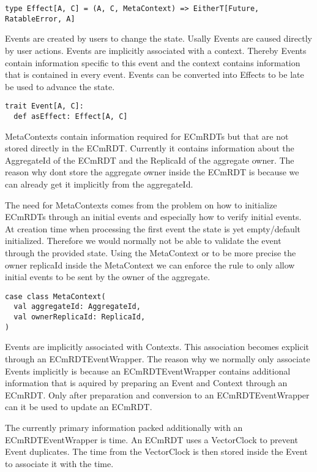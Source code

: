 \documentclass[
	ngerman,
	ruledheaders=section,   %
	class=report,		    %
	thesis={type=bachelor}, %
	accentcolor=9c,			%
	custommargins=false,    %
	marginpar=false,        %
	parskip=half-,          %
	fontsize=11pt,          %
]{tudapub}
\begin{document}
\begin{lstlisting}
type Effect[A, C] = (A, C, MetaContext) => EitherT[Future, RatableError, A]
\end{lstlisting}

Events are created by users to change the state. Usally Events are caused directly by user actions. Events are implicitly associated with a context. Thereby Events contain information specific to this event and the context contains information that is contained in every event. Events can be converted into Effects to be late be used to advance the state.

\begin{lstlisting}
trait Event[A, C]:
  def asEffect: Effect[A, C]
\end{lstlisting}

MetaContexts contain information required for ECmRDTs but that are not stored directly in the ECmRDT. Currently it contains information about the AggregateId of the ECmRDT and the ReplicaId of the aggregate owner. The reason why dont store the aggregate owner inside the ECmRDT is because we can already get it implicitly from the aggregateId.

The need for MetaContexts comes from the problem on how to initialize ECmRDTs through an initial events and especially how to verify initial events. At creation time when processing the first event the state is yet empty/default initialized. Therefore we would normally not be able to validate the event through the provided state. Using the MetaContext or to be more precise the owner replicaId inside the MetaContext we can enforce the rule to only allow initial events to be sent by the owner of the aggregate.

\begin{lstlisting}
case class MetaContext(
  val aggregateId: AggregateId,
  val ownerReplicaId: ReplicaId,
)
\end{lstlisting}

Events are implicitly associated with Contexts. This association becomes explicit through an ECmRDTEventWrapper. The reason why we normally only associate Events implicitly is because an ECmRDTEventWrapper contains additional information that is aquired by preparing an Event and Context through an ECmRDT. Only after preparation and conversion to an ECmRDTEventWrapper can it be used to update an ECmRDT. 

The currently primary information packed additionally with an ECmRDTEventWrapper is time. An ECmRDT uses a VectorClock to prevent Event duplicates. The time from the VectorClock is then stored inside the Event to associate it with the time.
\end{document}

